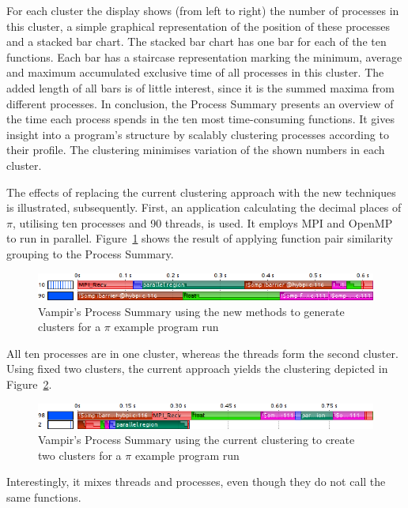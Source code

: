 \documentclass[a4paper, final, diplominf]{zih-template}
\begin{document}
For each cluster the display shows (from left to right) the number of processes in this cluster, a simple graphical representation of the position of these processes and a stacked bar chart.
The stacked bar chart has one bar for each of the ten functions.
Each bar has a staircase representation marking the minimum, average and maximum accumulated exclusive time of all processes in this cluster.
The added length of all bars is of little interest, since it is the summed maxima from different processes.
In conclusion, the Process Summary presents an overview of the time each process spends in the ten most time-consuming functions.
It gives insight into a program's structure by scalably clustering processes according to their profile.
The clustering minimises variation of the shown numbers in each cluster.

The effects of replacing the current clustering approach with the new techniques is illustrated, subsequently.
First, an application calculating the decimal places of $\pi$, utilising ten processes and 90 threads, is used.
It employs MPI and OpenMP to run in parallel.
Figure~\ref{fig:pi-ring-100p-hybrid-new-clustering} shows the result of applying function pair similarity grouping to the Process Summary.
\begin{figure}[tb]
	\centering
	\includegraphics[width=13cm]{pi-ring-100p-hybrid-new-clustering}
	\caption{Vampir's Process Summary using the new methods to generate clusters for a $\pi$ example program run}
	\label{fig:pi-ring-100p-hybrid-new-clustering}
\end{figure}
All ten processes are in one cluster, whereas the threads form the second cluster.
Using fixed two clusters, the current approach yields the clustering depicted in Figure~\ref{fig:pi-ring-100p-hybrid-old-clustering}.
\begin{figure}[tb]
	\centering
	\includegraphics[width=13cm]{pi-ring-100p-hybrid-old-clustering}
	\caption{Vampir's Process Summary using the current clustering to create two clusters for a $\pi$ example program run}
	\label{fig:pi-ring-100p-hybrid-old-clustering}
\end{figure}
Interestingly, it mixes threads and processes, even though they do not call the same functions.
\end{document}
